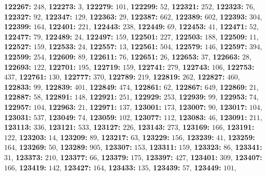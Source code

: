 \textsf{\bfseries 122267:} $248$, \textsf{\bfseries 122273:} $3$, \textsf{\bfseries 122279:} $101$, \textsf{\bfseries 122299:} $52$, \textsf{\bfseries 122321:} $252$, \textsf{\bfseries 122323:} $76$, \textsf{\bfseries 122327:} $92$, \textsf{\bfseries 122347:} $129$, \textsf{\bfseries 122363:} $29$, \textsf{\bfseries 122387:} $662$, \textsf{\bfseries 122389:} $602$, \textsf{\bfseries 122393:} $304$, \textsf{\bfseries 122399:} $164$, \textsf{\bfseries 122401:} $221$, \textsf{\bfseries 122443:} $238$, \textsf{\bfseries 122449:} $69$, \textsf{\bfseries 122453:} $41$, \textsf{\bfseries 122471:} $52$, \textsf{\bfseries 122477:} $79$, \textsf{\bfseries 122489:} $24$, \textsf{\bfseries 122497:} $159$, \textsf{\bfseries 122501:} $227$, \textsf{\bfseries 122503:} $188$, \textsf{\bfseries 122509:} $11$, \textsf{\bfseries 122527:} $159$, \textsf{\bfseries 122533:} $24$, \textsf{\bfseries 122557:} $13$, \textsf{\bfseries 122561:} $504$, \textsf{\bfseries 122579:} $146$, \textsf{\bfseries 122597:} $394$, \textsf{\bfseries 122599:} $254$, \textsf{\bfseries 122609:} $89$, \textsf{\bfseries 122611:} $76$, \textsf{\bfseries 122651:} $26$, \textsf{\bfseries 122653:} $37$, \textsf{\bfseries 122663:} $28$, \textsf{\bfseries 122693:} $122$, \textsf{\bfseries 122701:} $195$, \textsf{\bfseries 122719:} $159$, \textsf{\bfseries 122741:} $279$, \textsf{\bfseries 122743:} $106$, \textsf{\bfseries 122753:} $437$, \textsf{\bfseries 122761:} $130$, \textsf{\bfseries 122777:} $370$, \textsf{\bfseries 122789:} $219$, \textsf{\bfseries 122819:} $262$, \textsf{\bfseries 122827:} $460$, \textsf{\bfseries 122833:} $99$, \textsf{\bfseries 122839:} $401$, \textsf{\bfseries 122849:} $474$, \textsf{\bfseries 122861:} $62$, \textsf{\bfseries 122867:} $649$, \textsf{\bfseries 122869:} $21$, \textsf{\bfseries 122887:} $58$, \textsf{\bfseries 122891:} $148$, \textsf{\bfseries 122921:} $251$, \textsf{\bfseries 122929:} $253$, \textsf{\bfseries 122939:} $99$, \textsf{\bfseries 122953:} $74$, \textsf{\bfseries 122957:} $104$, \textsf{\bfseries 122963:} $21$, \textsf{\bfseries 122971:} $137$, \textsf{\bfseries 123001:} $173$, \textsf{\bfseries 123007:} $90$, \textsf{\bfseries 123017:} $104$, \textsf{\bfseries 123031:} $537$, \textsf{\bfseries 123049:} $74$, \textsf{\bfseries 123059:} $102$, \textsf{\bfseries 123077:} $112$, \textsf{\bfseries 123083:} $46$, \textsf{\bfseries 123091:} $211$, \textsf{\bfseries 123113:} $336$, \textsf{\bfseries 123121:} $533$, \textsf{\bfseries 123127:} $226$, \textsf{\bfseries 123143:} $273$, \textsf{\bfseries 123169:} $166$, \textsf{\bfseries 123191:} $122$, \textsf{\bfseries 123203:} $14$, \textsf{\bfseries 123209:} $89$, \textsf{\bfseries 123217:} $63$, \textsf{\bfseries 123229:} $156$, \textsf{\bfseries 123239:} $41$, \textsf{\bfseries 123259:} $164$, \textsf{\bfseries 123269:} $50$, \textsf{\bfseries 123289:} $905$, \textsf{\bfseries 123307:} $153$, \textsf{\bfseries 123311:} $159$, \textsf{\bfseries 123323:} $86$, \textsf{\bfseries 123341:} $31$, \textsf{\bfseries 123373:} $210$, \textsf{\bfseries 123377:} $66$, \textsf{\bfseries 123379:} $175$, \textsf{\bfseries 123397:} $427$, \textsf{\bfseries 123401:} $309$, \textsf{\bfseries 123407:} $166$, \textsf{\bfseries 123419:} $142$, \textsf{\bfseries 123427:} $164$, \textsf{\bfseries 123433:} $135$, \textsf{\bfseries 123439:} $57$, \textsf{\bfseries 123449:} $101$, 
